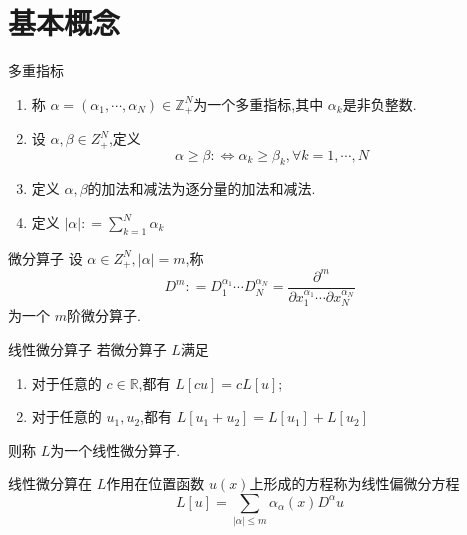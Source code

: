 \documentclass[../../PDE.tex]{subfiles}
\begin{document}
\ifSubfilesClassLoaded{
    \frontmatter

    \tableofcontents
    
    \mainmatter
}{}


\chapter{基本概念}

\begin{definition}{多重指标}
  \begin{enumerate}
    \item   称 \(  \alpha = \left(  \alpha_1,\cdots,\alpha_N \right)\in \mathbb{Z} _{+ }^{N}   \)为一个多重指标,其中 \(  \alpha _{k}  \)是非负整数. 
    \item 设 \(   \alpha , \beta \in Z_{+ }^{N}  \),定义 \[
    \alpha \ge \beta :\iff \alpha _{k}\ge \beta _k ,\forall k=  1,\cdots,N
    \] 
    \item 定义 \(  \alpha ,\beta   \)的加法和减法为逐分量的加法和减法. 
    \item 定义 \(  \left| \alpha  \right|: =  \sum _{k= 1}^{N}\alpha _{k}   \) 
  \end{enumerate}
   
\end{definition}

\begin{definition}{微分算子}
    设 \(  \alpha \in Z_{+ }^{N}, \left| \alpha  \right|= m   \),称 \[
    D^{m} : =  D_{1}^{ \alpha _1 }\cdots D_{N}^{ \alpha _{N}}=  \frac{\partial ^{m} }{\partial x_1^{\alpha _1 }\cdots \partial x_{N}^{ \alpha _{N}} } 
    \] 为一个 \(  m  \)阶微分算子. 
\end{definition}

\begin{definition}{线性微分算子}
    若微分算子 \(  L  \)满足 
    \begin{enumerate}
        \item 对于任意的 \(  c \in \mathbb{R}   \),都有 \(  L\left[ cu \right]= cL\left[ u \right]    \);
        \item 对于任意的 \(  u_1,u_2  \),都有 \(  L\left[ u_1+ u_2 \right]= L\left[ u_1 \right]+ L\left[ u_2 \right]     \)    
    \end{enumerate}
     则称 \(  L  \)为一个线性微分算子. 
\end{definition}

\begin{definition}
    线性微分算在 \(  L  \)作用在位置函数 \(  u\left( x \right)   \)上形成的方程称为线性偏微分方程 \[
    L\left[ u \right]= \sum _{\left| \alpha  \right|\le m } \alpha _{\alpha }\left( x \right)  D^{\alpha }u
    \]  
\end{definition}
\end{document}
